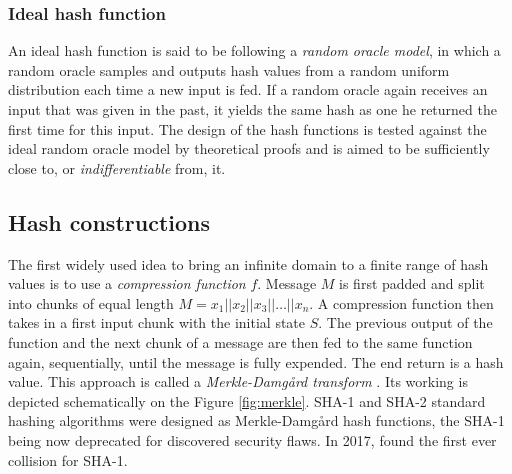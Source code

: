 \subsubsection{Ideal hash function}
An ideal hash function is said to be following a \textit{random oracle model}, in which a random oracle samples and outputs hash values from a random uniform distribution each time a new input is fed. If a random oracle again receives an input that was given in the past, it yields the same hash as one he returned the first time for this input. The design of the hash functions is tested against the ideal random oracle model by theoretical proofs and is aimed to be sufficiently close to, or \textit{indifferentiable} from, it.

\subsection{Hash constructions}
The first widely used idea to bring an infinite domain to a finite range of hash values is to use a \textit{compression function} $f$. Message $M$ is first padded and split into chunks of equal length $M=x_1||x_2||x_3||\ldots||x_n$. A compression function then takes in a first input chunk with the initial state $S$. The previous output of the function and the next chunk of a message are then fed to the same function again, sequentially, until the message is fully expended. The end return is a hash value. This approach is called a \textit{Merkle-Damgård transform} \cite{coronMerkleDamgardRevisitedHow2005}. Its working is depicted schematically on the Figure \ref{fig:merkle}. SHA-1 and SHA-2 standard hashing algorithms were designed as Merkle-Damgård hash functions, the SHA-1 being now deprecated for discovered security flaws. In 2017, \cite{firstcollision} found the first ever collision for SHA-1.

